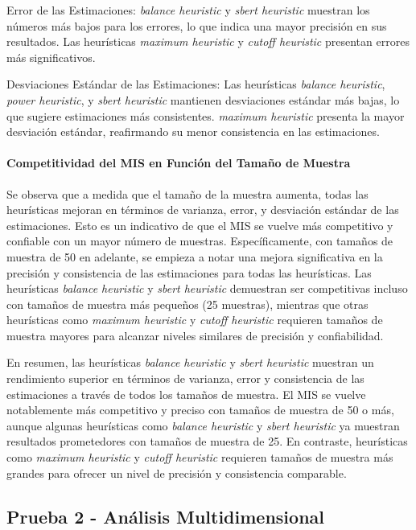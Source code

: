 \documentclass{article}
\begin{document}
Error de las Estimaciones: \textit{balance heuristic} y \textit{sbert heuristic} muestran los números más bajos para los errores, lo que indica una mayor precisión en sus resultados.
Las heurísticas \textit{maximum heuristic} y \textit{cutoff heuristic} presentan errores más significativos.

Desviaciones Estándar de las Estimaciones: Las heurísticas \textit{balance heuristic}, \textit{power heuristic}, y \textit{sbert heuristic} mantienen desviaciones estándar más bajas, lo que sugiere estimaciones más consistentes.
\textit{maximum heuristic} presenta la mayor desviación estándar, reafirmando su menor consistencia en las estimaciones.

\paragraph{Competitividad del MIS en Función del Tamaño de Muestra}
Se observa que a medida que el tamaño de la muestra aumenta, todas las heurísticas mejoran en términos de varianza, error, y desviación estándar de las estimaciones. Esto es un indicativo de que el MIS se vuelve más competitivo y confiable con un mayor número de muestras.
Específicamente, con tamaños de muestra de 50 en adelante, se empieza a notar una mejora significativa en la precisión y consistencia de las estimaciones para todas las heurísticas.
Las heurísticas \textit{balance heuristic} y \textit{sbert heuristic} demuestran ser competitivas incluso con tamaños de muestra más pequeños (25 muestras), mientras que otras heurísticas como \textit{maximum heuristic} y \textit{cutoff heuristic} requieren tamaños de muestra mayores para alcanzar niveles similares de precisión y confiabilidad.

En resumen, las heurísticas \textit{balance heuristic} y \textit{sbert heuristic} muestran un rendimiento superior en términos de varianza, error y consistencia de las estimaciones a través de todos los tamaños de muestra. El MIS se vuelve notablemente más competitivo y preciso con tamaños de muestra de 50 o más, aunque algunas heurísticas como \textit{balance heuristic} y \textit{sbert heuristic} ya muestran resultados prometedores con tamaños de muestra de 25. En contraste, heurísticas como \textit{maximum heuristic} y \textit{cutoff heuristic} requieren tamaños de muestra más grandes para ofrecer un nivel de precisión y consistencia comparable.

\subsection{Prueba 2 - Análisis Multidimensional}
\end{document}
